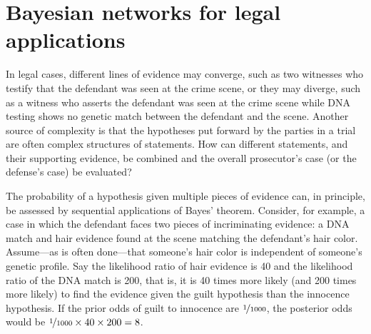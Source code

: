 \documentclass{article}
\begin{document}
\section{Bayesian networks for legal applications}\label{sec:BNs}
 
 
In legal cases, different lines of evidence may converge, such as two witnesses %
who testify that the defendant was seen at the crime scene, or they may diverge, such as a witness who asserts the defendant was seen at the crime scene while DNA testing shows no genetic match between the defendant and the scene. Another source of complexity is that the hypotheses put forward by the parties in a trial are often complex structures of statements. 
How can different statements, and their supporting evidence, be combined and the overall prosecutor's case (or the defense's case) be evaluated?


The probability of a hypothesis  given multiple pieces of evidence can, in principle, be assessed by sequential applications of Bayes' theorem. 
Consider, for example, a case in which the defendant faces two pieces of incriminating evidence: a DNA match and hair evidence found at the scene matching the defendant's hair color.
Assume---as is often 
done---that someone's hair color is independent of someone's genetic profile. Say the likelihood ratio of hair evidence is 40 and the likelihood ratio of the DNA match is 200, that is, it is 40 times more likely (and 200 times more likely) to find the evidence given the guilt hypothesis than the innocence hypothesis. If the prior odds of guilt to innocence are $\nicefrac{1}{1000}$, the posterior odds would be $\nicefrac{1}{1000}\times 40\times 200=8$.  
\end{document}
